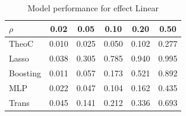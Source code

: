 \documentclass{article}
\begin{document}
\begin{table}[t]
    \centering
    \begin{tabular}{lccccc}
\toprule
$\rho$ & 0.02 & 0.05 & 0.10 & 0.20 & 0.50 \\
\midrule
TheoC & {\cellcolor[HTML]{3B4CC0}} \color[HTML]{F1F1F1} 0.010 & {\cellcolor[HTML]{3B4CC0}} \color[HTML]{F1F1F1} 0.025 & {\cellcolor[HTML]{3B4CC0}} \color[HTML]{F1F1F1} 0.050 & {\cellcolor[HTML]{3B4CC0}} \color[HTML]{F1F1F1} 0.102 & {\cellcolor[HTML]{3B4CC0}} \color[HTML]{F1F1F1} 0.277 \\
Lasso & {\cellcolor[HTML]{EE8468}} \color[HTML]{F1F1F1} 0.038 & {\cellcolor[HTML]{B40426}} \color[HTML]{F1F1F1} 0.305 & {\cellcolor[HTML]{B40426}} \color[HTML]{F1F1F1} 0.785 & {\cellcolor[HTML]{B40426}} \color[HTML]{F1F1F1} 0.940 & {\cellcolor[HTML]{B40426}} \color[HTML]{F1F1F1} 0.995 \\
Boosting & {\cellcolor[HTML]{4358CB}} \color[HTML]{F1F1F1} 0.011 & {\cellcolor[HTML]{5E7DE7}} \color[HTML]{F1F1F1} 0.057 & {\cellcolor[HTML]{6F92F3}} \color[HTML]{F1F1F1} 0.173 & {\cellcolor[HTML]{DDDCDC}} \color[HTML]{000000} 0.521 & {\cellcolor[HTML]{E26952}} \color[HTML]{F1F1F1} 0.892 \\
MLP & {\cellcolor[HTML]{ADC9FD}} \color[HTML]{000000} 0.022 & {\cellcolor[HTML]{536EDD}} \color[HTML]{F1F1F1} 0.047 & {\cellcolor[HTML]{506BDA}} \color[HTML]{F1F1F1} 0.104 & {\cellcolor[HTML]{506BDA}} \color[HTML]{F1F1F1} 0.162 & {\cellcolor[HTML]{82A6FB}} \color[HTML]{F1F1F1} 0.435 \\
Trans & {\cellcolor[HTML]{B40426}} \color[HTML]{F1F1F1} 0.045 & {\cellcolor[HTML]{C5D6F2}} \color[HTML]{000000} 0.141 & {\cellcolor[HTML]{82A6FB}} \color[HTML]{F1F1F1} 0.212 & {\cellcolor[HTML]{97B8FF}} \color[HTML]{000000} 0.336 & {\cellcolor[HTML]{EFCFBF}} \color[HTML]{000000} 0.693 \\
\bottomrule
\end{tabular}
\vskip 0.05in
\caption{Model performance for effect Linear}
    \label{table_lin}
    \end{table}
\end{document}
